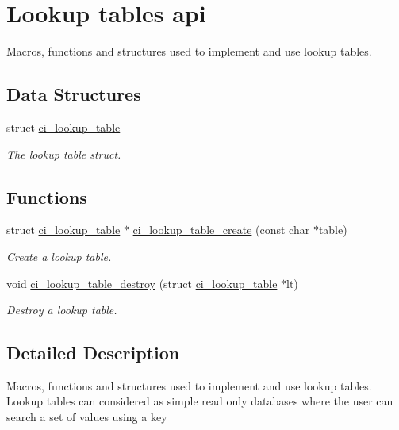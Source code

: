 \hypertarget{group__LOOKUPTABLE}{
\section{Lookup tables api}
\label{group__LOOKUPTABLE}
}


Macros, functions and structures used to implement and use lookup tables.  
\subsection*{Data Structures}
\begin{DoxyCompactItemize}
\item 
struct \hyperlink{structci__lookup__table}{ci\_\-lookup\_\-table}
\begin{DoxyCompactList}\small\item\em The lookup table struct. \item\end{DoxyCompactList}\end{DoxyCompactItemize}
\subsection*{Functions}
\begin{DoxyCompactItemize}
\item 
struct \hyperlink{structci__lookup__table}{ci\_\-lookup\_\-table} $\ast$ \hyperlink{group__LOOKUPTABLE_ga849f0e7f5cc543281be8ac236a978006}{ci\_\-lookup\_\-table\_\-create} (const char $\ast$table)
\begin{DoxyCompactList}\small\item\em Create a lookup table. \item\end{DoxyCompactList}\item 
void \hyperlink{group__LOOKUPTABLE_ga8329bdf3b89156854173e4638f75dfb7}{ci\_\-lookup\_\-table\_\-destroy} (struct \hyperlink{structci__lookup__table}{ci\_\-lookup\_\-table} $\ast$lt)
\begin{DoxyCompactList}\small\item\em Destroy a lookup table. \item\end{DoxyCompactList}\end{DoxyCompactItemize}


\subsection{Detailed Description}
Macros, functions and structures used to implement and use lookup tables. Lookup tables can considered as simple read only databases where the user can search a set of values using a key 

